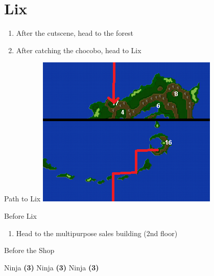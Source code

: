 \chapter{Lix}

\vspace{\baselineskip}

\begin{paracol}{2}

\begin{enumerate}
    \item After the cutscene, head to the forest
    \item After catching the chocobo, head to Lix
\end{enumerate}

\switchcolumn
\begin{misc}{Path to Lix}
    \includegraphics[scale=1.45]{../Graphics/Maps/3. To Lix.png}
\end{misc}

\begin{steproute}{Before Lix}
\end{steproute}

\switchcolumn*
\vspace{-1.5cm}
\begin{enumerate}[resume]
    \item Head to the multipurpose sales building (2nd floor)
\end{enumerate}

\begin{menu}{Before the Shop}
    \varwb
    \begin{jobMenu}
        \lenna Ninja \textbf{(3\pointRight)} \ability{!\black}
        \galuf Ninja \textbf{(3\pointRight)} \ability{!\observe}
        \faris Ninja \textbf{(3\pointRight)} \ability{!\black}
    \end{jobMenu}
    \varwe
\end{menu}


\end{paracol}
